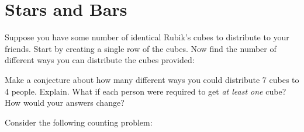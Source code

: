 \documentclass[12pt]{article}
\begin{document}
\section{Stars and Bars}

\begin{activity}

\begin{questions}
\question Suppose you have some number of identical Rubik's cubes to distribute to your friends.  Start by creating a single row of the cubes.  Now find the number of different ways you can distribute the cubes provided:
\question Make a conjecture about how many different ways you could distribute 7 cubes to 4 people.  Explain.
\question What if each person were required to get {\em at least one} cube?  How would your answers change?
\end{questions}

\end{activity}

Consider the following counting problem:
\end{document}
